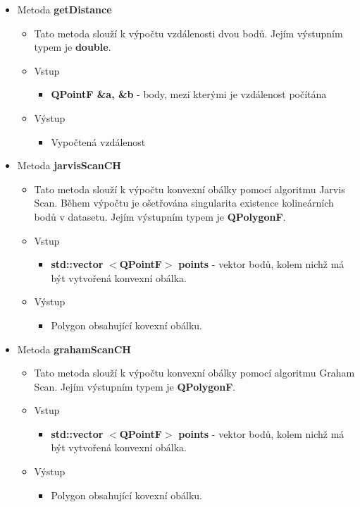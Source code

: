\documentclass[a4paper, 12pt]{article}
\begin{document}
\begin{itemize}
\begin{itemize}
		\end{itemize}

	\item Metoda \textbf{getDistance}
		\begin{itemize}
			\item Tato metoda slouží k výpočtu vzdálenosti dvou bodů. Jejím výstupním typem je \textbf{double}.
			\item Vstup
				\begin{itemize}
					\item \textbf{QPointF \&a, \&b} - body, mezi kterými je vzdálenost počítána
				\end{itemize}
			\item Výstup
				\begin{itemize}	
					\item Vypočtená vzdálenost
				\end{itemize}
		\end{itemize}

	\item Metoda \textbf{jarvisScanCH}
		\begin{itemize}
			\item Tato metoda slouží k výpočtu konvexní obálky pomocí algoritmu Jarvis Scan. Během výpočtu je ošetřována singularita existence kolineárních bodů v datasetu. Jejím výstupním typem je \textbf{QPolygonF}.
			\item Vstup
				\begin{itemize}
					\item \textbf{std::vector} $<$\textbf{QPointF}$>$ \textbf{points} - vektor bodů, kolem nichž má být vytvořená konvexní obálka.
				\end{itemize}
			\item Výstup
				\begin{itemize}
					\item Polygon obsahující kovexní obálku.
				\end{itemize} 
		\end{itemize}

	\item Metoda \textbf{grahamScanCH}
		\begin{itemize}
			\item Tato metoda slouží k výpočtu konvexní obálky pomocí algoritmu Graham Scan. Jejím výstupním typem je \textbf{QPolygonF}.
			\item Vstup
				\begin{itemize}
					\item \textbf{std::vector} $<$\textbf{QPointF}$>$ \textbf{points} - vektor bodů, kolem nichž má být vytvořená konvexní obálka.
				\end{itemize}
			\item Výstup
				\begin{itemize}
					\item Polygon obsahující kovexní obálku.
				\end{itemize} 
		\end{itemize}


\end{itemize}
\end{document}
